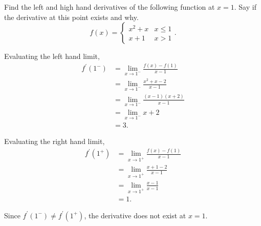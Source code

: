 \begin{example}
	Find the left and high hand derivatives of the following function at $x=1$.
	Say if the derivative at this point exists and why.
	\begin{equation*}
		f(x) = \begin{cases}
			x^2 + x & x \leq 1 \\
			x+1 & x > 1
		\end{cases}.
	\end{equation*}
\end{example}
\begin{answer}
	Evaluating the left hand limit,
	\begin{align*}
		f^\prime(1^-) &= \lim_{x \to 1^-}{\frac{f(x)-f(1)}{x-1}} \\
		&= \lim_{x \to 1^-}{\frac{x^2 + x - 2}{x-1}} \\
		&= \lim_{x \to 1^-}{\frac{(x-1)(x+2)}{x-1}} \\
		&= \lim_{x \to 1^-}{x+2} \\
		&= 3.
	\end{align*}
	
	Evaluating the right hand limit,
	\begin{align*}
		f^\prime(1^+) &= \lim_{x \to 1^+}{\frac{f(x)-f(1)}{x-1}} \\
		&= \lim_{x \to 1^+}{\frac{x + 1 - 2}{x-1}} \\
		&= \lim_{x \to 1^+}{\frac{x-1}{x-1}} \\
		&= 1.
	\end{align*}
	
	Since $f^\prime(1^-) \neq f^\prime(1^+)$, the derivative does not exist at $x=1$.
\end{answer}